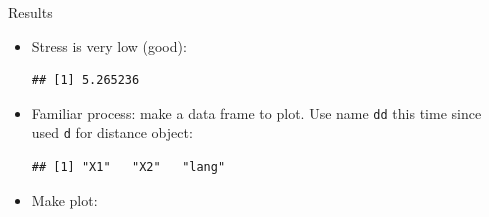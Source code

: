 \begin{frame}[fragile]{Results}
  
  
  \begin{itemize}
  \item Stress is very low (good):
    
\begin{knitrout}
\color{fgcolor}\begin{kframe}
\begin{alltt}
\hlopt{$}
\end{alltt}
\begin{verbatim}
## [1] 5.265236
\end{verbatim}
\end{kframe}
\end{knitrout}

\item Familiar process: make a data frame to plot. Use name
  \texttt{dd} this time since used \texttt{d} for distance object:
  
\begin{knitrout}
\color{fgcolor}\begin{kframe}
\begin{alltt}
\hlkwb{=}\hlopt{$}\hlstd{=}
\end{alltt}
\begin{verbatim}
## [1] "X1"   "X2"   "lang"
\end{verbatim}
\end{kframe}
\end{knitrout}

\item Make plot:
  
\begin{knitrout}
\color{fgcolor}\begin{kframe}
\begin{alltt}
\hlkwb{=}\hlstd{(}\hlopt{+}
  \hlstd{()}\hlopt{+}\hlstd{()}
\end{alltt}
\end{kframe}
\end{knitrout}

  \end{itemize}
\end{frame}


